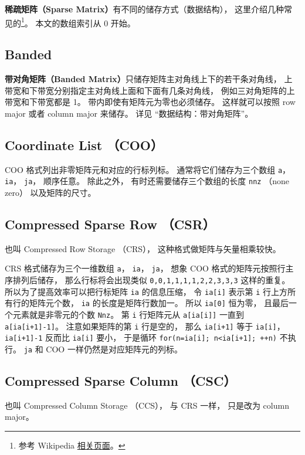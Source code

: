 
\textbf{稀疏矩阵（Sparse Matrix）}有不同的储存方式（数据结构）， 这里介绍几种常见的\footnote{参考 Wikipedia \href{https://en.wikipedia.org/wiki/Sparse_matrix}{相关页面}。}。 本文的数组索引从 0 开始。

\subsection{Banded}
\textbf{带对角矩阵（Banded Matrix）}只储存矩阵主对角线上下的若干条对角线， 上带宽和下带宽分别指定主对角线上面和下面有几条对角线， 例如三对角矩阵的上带宽和下带宽都是 1。 带内即使有矩阵元为零也必须储存。 这样就可以按照 row major 或者 column major 来储存。 详见 “数据结构：带对角矩阵”。

\subsection{Coordinate List （COO）}
COO 格式列出非零矩阵元和对应的行标列标。 通常将它们储存为三个数组 \verb|a|， \verb|ia|， \verb|ja|， 顺序任意。 除此之外， 有时还需要储存三个数组的长度 \verb|nnz| （none zero） 以及矩阵的尺寸。

\subsection{Compressed Sparse Row （CSR）}
也叫 Compressed Row Storage （CRS）， 这种格式做矩阵与矢量相乘较快。

CRS 格式储存为三个一维数组 \verb|a|， \verb|ia|， \verb|ja|， 想象 COO 格式的矩阵元按照行主序排列后储存， 那么行标将会出现类似 \verb|0,0,1,1,1,1,2,2,3,3,3| 这样的重复。 所以为了提高效率可以把行标矩阵 \verb|ia| 的信息压缩， 令 \verb|ia[i]| 表示第 \verb|i| 行上方所有行的矩阵元个数， \verb|ia| 的长度是矩阵行数加一。 所以 \verb|ia[0]| 恒为零， 且最后一个元素就是非零元的个数 \verb|Nnz|。 第 \verb|i| 行矩阵元从 \verb|a[ia[i]]| 一直到 \verb|a[ia[i+1]-1]|。 注意如果矩阵的第 \verb|i| 行是空的， 那么 \verb|ia[i+1]| 等于 \verb|ia[i]|， \verb|ia[i+1]-1| 反而比 \verb|ia[i]| 要小， 于是循环 \verb|for(n=ia[i]; n<ia[i+1]; ++n)| 不执行。 \verb|ja| 和 COO 一样仍然是对应矩阵元的列标。

\subsection{Compressed Sparse Column （CSC）}
也叫 Compressed Column Storage （CCS）， 与 CRS 一样， 只是改为 column major。
